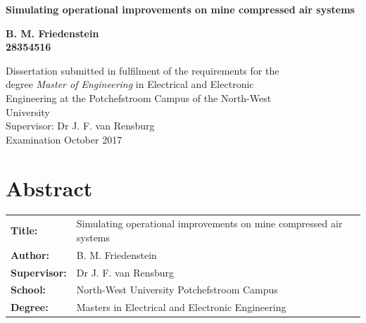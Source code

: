 \documentclass[12pt, english, oneside]{report}%
\begin{document}
\begin{titlepage}
	\BgThispage	
		\vspace{0cm}
		\begin{center}
			\textbf{\singlespacing\huge{Simulating operational improvements on mine compressed air systems}\\
			}\par
			\vspace{3cm}
			\LARGE{ \textbf{B. M. Friedenstein \\28354516} }
		\end{center}
	
	\vspace{2cm}
	
\begin{flushleft}
	{\singlespacing\centering \large Dissertation submitted in fulfilment of the requirements for the \\ degree {\color{MasterBlue} \textit{Master of Engineering}} in {\color{MasterBlue}Electrical and Electronic \\ Engineering} at the Potchefstroom Campus of the North-West\\ University\\
	}
	\vspace{2cm}
	{\large \setlength{\parindent}{0.5cm} Supervisor: Dr J. F. van Rensburg \\
	\vspace{1cm}
	\large{Examination October 2017}\\		
	}
\end{flushleft}
\end{titlepage}
\clearpage

{\tiny }\section*{Abstract}
	\thispagestyle{plain}
	\vspace{0.2cm}
	\begin{tabular}{p{2.35cm}p{13cm}}
		\textbf{Title:} & Simulating operational improvements on mine compressed air systems  \\
		\textbf{Author:} & B. M. Friedenstein \\
		\textbf{Supervisor:} & Dr J. F. van Rensburg \\
		\textbf{School:} & North-West University Potchefstroom Campus\\
		\textbf{Degree:} & Masters in Electrical and Electronic Engineering \\
	\end{tabular}
	\vspace{1cm}
\end{document}
